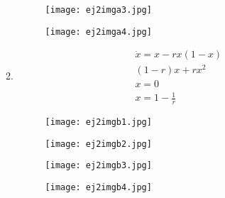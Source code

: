 \documentclass[a4paper,10pt]{article}
\begin{document}
\begin{enumerate}
\begin{enumerate}
\begin{figure}[h]
                    \label{fig:mesh1}
                \end{figure}
                \begin{figure}[h]
                    \centering
                    \texttt{[image: ej2imga3.jpg]}
                    
                    \label{fig:mesh1}
                \end{figure}
                \newpage
                \begin{figure}[h]
                    \centering
                    \texttt{[image: ej2imga4.jpg]}
                    
                    \label{fig:mesh1}
                \end{figure}
            \item
                \begin{equation}
                    \begin{aligned}
                        \dot{x}= x- rx(1-x)\\
                        (1-r)x + rx^{2}\\
                        x= 0\\
                        x= 1 - \frac{1}{r}
                    \end{aligned}
                \end{equation}
               \begin{figure}[h]
                    \centering
                    \texttt{[image: ej2imgb1.jpg]}
                    \label{fig:mesh1}
                \end{figure}
                \newpage
                \begin{figure}[h]
                    \centering
                    \texttt{[image: ej2imgb2.jpg]}
                    \label{fig:mesh1}
                \end{figure}
                \begin{figure}[h]
                    \centering
                    \texttt{[image: ej2imgb3.jpg]}
                    \label{fig:mesh1}
                \end{figure}
                \newpage
                \begin{figure}[h]
                    \centering
                    \texttt{[image: ej2imgb4.jpg]}
                    \label{fig:mesh1}
                \end{figure}
                

\end{enumerate}
\end{enumerate}
\end{document}
